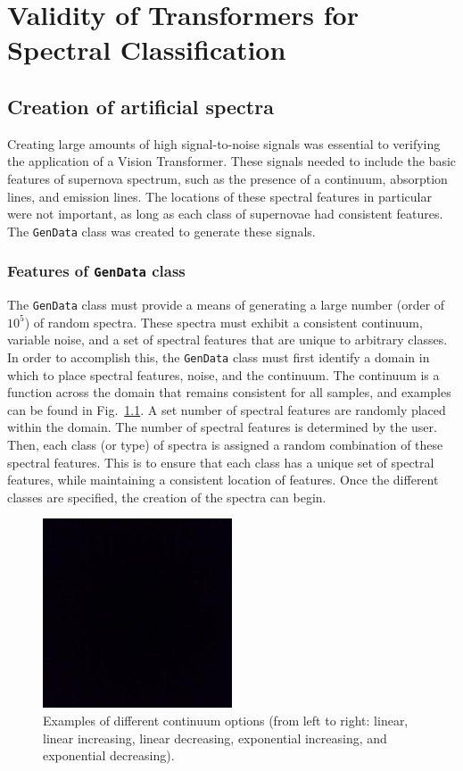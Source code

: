 \chapter{Validity of Transformers for Spectral Classification}
\label{chap:chapter-3}
\section{Creation of artificial spectra}
\label{sec:creation}
Creating large amounts of high signal-to-noise signals was essential to verifying 
the application of a Vision Transformer. These signals needed to include the 
basic features of supernova spectrum, such as the presence of a continuum, 
absorption lines, and emission lines. The locations of these spectral features 
in particular were not important, as long as each class of supernovae had consistent 
features. The \texttt{GenData} class was created to generate these signals. 

\subsection{Features of \texttt{GenData} class}
\label{ssec:features}
The \texttt{GenData} class must provide a means of generating a large number (order of $10^5$)
of random spectra. These spectra must exhibit a consistent continuum, variable noise, 
and a set of spectral features that are unique to arbitrary classes. In order to 
accomplish this, the \texttt{GenData} class must first identify a domain in which 
to place spectral features, noise, and the continuum. The continuum is a function across
the domain that remains consistent for all samples, and examples can be found in Fig.~\ref{fig:continuumoptions}.
A set number of spectral features are randomly placed within the domain. The number of spectral
features is determined by the user. Then, each class (or type) of spectra is assigned 
a random combination of these spectral features. This is to ensure that each class 
has a unique set of spectral features, while maintaining a consistent location of features. 
Once the different classes are specified, the creation of the spectra can begin.

\begin{figure}
    \centering
    \includegraphics[width=0.5\textwidth]{figures/blackbox.jpeg}
    \caption{Examples of different continuum options
    (from left to right: linear, linear increasing, linear decreasing, 
exponential increasing, and exponential decreasing).}
    \label{fig:continuumoptions}
\end{figure}

